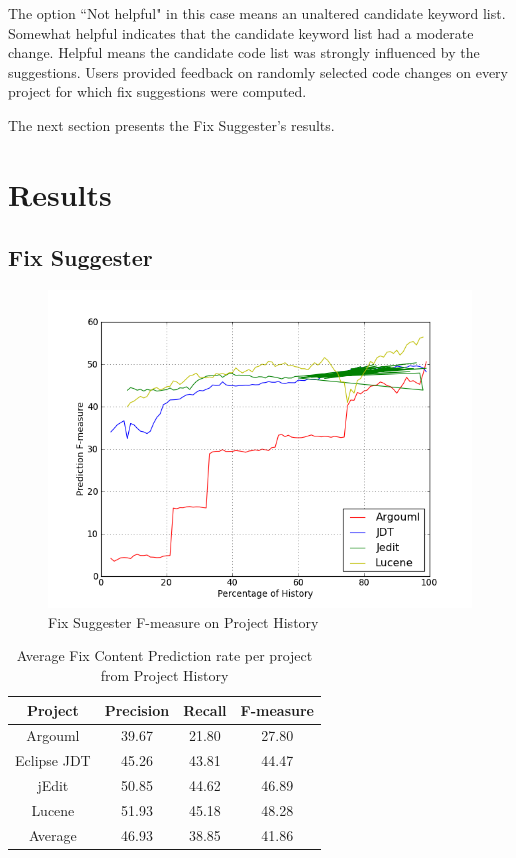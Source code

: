 \documentclass[conference]{IEEEtran}
\begin{document}
The option ``Not helpful" in this case means an unaltered candidate keyword list. Somewhat helpful indicates that the candidate keyword list had a moderate change. Helpful means the candidate code list was strongly influenced by the suggestions. Users provided feedback on randomly selected code changes on every project for which fix suggestions were computed.

The next section presents the Fix Suggester's results.

\section{Results}
\label{Results}
\subsection{Fix Suggester}
\label{FixContentPredictionResults}

\begin{figure}[t]
\begin{center}
 \includegraphics[scale=0.45]{pictures/rq1.png}
\end{center}
\caption{Fix Suggester F-measure on Project History}
\label{Figure:FixSuggesterResults}
\end{figure}



\begin{table}\centering
\caption{Average Fix Content Prediction rate per project from Project History}
\label{tab:AvgFeedback}
\begin{tabular}{cccc}
\hline
Project &  Precision &  Recall &  F-measure\\ 
\hline
Argouml &  39.67 &  21.80 &  27.80\\ 
\hline
Eclipse JDT &  45.26 &  43.81 &  44.47\\ 
\hline
jEdit &  50.85 &  44.62 &  46.89\\ 
\hline
Lucene &  51.93 &  45.18 &  48.28\\ 
\hline
Average &  46.93 &  38.85 &  41.86\\ 
\hline
\end{tabular}

\end{table}
\end{document}
